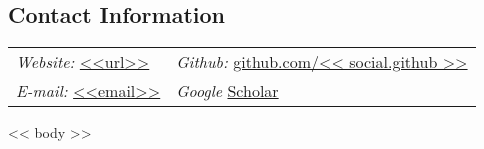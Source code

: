 \documentclass[margin,line]{res}
\begin{document}
\newcommand{\wilka}{{\bf{\color{nice_purple}Wilka Carvalho}}}

\begin{resume}

\section{\sc Contact Information}
  \vspace{.05in}
  \begin{tabular}{@{}p{2in}p{4in}}
    {\it Website:} \href{<<url>>}{\color{links}<<url>>} & {\it Github:}  \href{https://github.com/<< social.github >>}{\color{links}github.com/<< social.github >>} \\
    {\it E-mail:} \href{mailto:<<email>>}{\color{links}<<email>>} & {\it Google}  \href{https://scholar.google.com/citations?user=<<social.google_scholar>>&hl=en}{\color{links}Scholar} 
  \end{tabular}

<< body >>

\end{resume}
\end{document}
